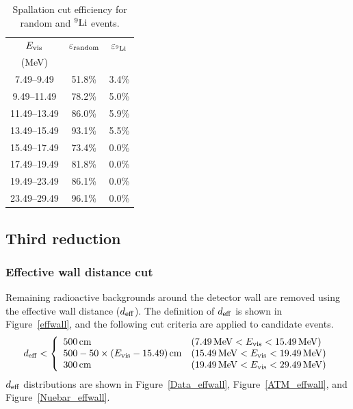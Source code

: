 \begin{table}[H]
	\centering
	\caption[Spallation cut efficiency for random and $^{9}{\rm Li}$ events]{
	Spallation cut efficiency for random and $^{9}{\rm Li}$ events.
	}\label{tab:spa}
	\vs
	\begin{tabular}{ccc} \hline \hline
		$E_{\rm vis}$ & $\varepsilon_{\rm random}$ & $\varepsilon_{\rm ^{9}Li}$ \\
		(MeV)         &                            &                            \\ \hline
		7.49--9.49    & 51.8\%                     & 3.4\%                      \\
		9.49--11.49   & 78.2\%                     & 5.0\%                      \\
		11.49--13.49  & 86.0\%                     & 5.9\%                      \\
		13.49--15.49  & 93.1\%                     & 5.5\%                      \\
		15.49--17.49  & 73.4\%                     & 0.0\%                      \\
		17.49--19.49  & 81.8\%                     & 0.0\%                      \\
		19.49--23.49  & 86.1\%                     & 0.0\%                      \\
		23.49--29.49  & 96.1\%                     & 0.0\%                      \\ \hline \hline
	\end{tabular}
\end{table}





\subsection{Third reduction}
\subsubsection{Effective wall distance cut}
\vs\hs
Remaining radioactive backgrounds around the detector wall are removed using the effective wall distance ($d_{\rm eff}$).
The definition of $d_{\rm eff}$ is shown in Figure~\ref{effwall}, and the following cut criteria are applied to candidate events.
\begin{eqnarray}
	d_{\rm eff} < \left
	\{\begin{array}{lll}
		500\,{\rm cm}                                   & (7.49\,{\rm MeV} < E_{\rm vis} < 15.49\,{\rm MeV})  \\
		500 - 50 \times (E_{\rm vis} - 15.49)\,{\rm cm} & (15.49\,{\rm MeV} < E_{\rm vis} < 19.49\,{\rm MeV}) \\
		300\,{\rm cm}                                   & (19.49\,{\rm MeV} < E_{\rm vis} < 29.49\,{\rm MeV})
	\end{array}
	\right.
\end{eqnarray}
$d_{\rm eff}$ distributions are shown in Figure~\ref{Data_effwall}, Figure~\ref{ATM_effwall}, and Figure~\ref{Nuebar_effwall}.

